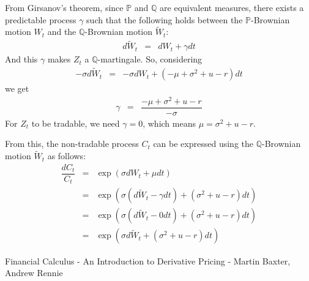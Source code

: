 \documentclass[uplatex,a4j,12pt,dvipdfmx]{jsarticle}
\begin{document}
From Girsanov's theorem, since $\mathbb{P}$ and $\mathbb{Q}$ are equivalent measures, there exists a predictable process $\gamma$ such that the following holds between the $\mathbb{P}$-Brownian motion $W_{t}$ and the $\mathbb{Q}$-Brownian motion $\tilde{W}_{t}$:
%
%
\begin{eqnarray*}
	d \tilde{W}_{t}
	&=&
	d W_{t} + \gamma dt
\end{eqnarray*}
%
%
And this $\gamma$ makes $Z_{t}$ a $\mathbb{Q}$-martingale. So, considering
%
%
\begin{eqnarray*}
	- \sigma d \tilde{W}_{t}
	&=&
	- \sigma d W_{t} + \left( - \mu + \sigma^{2} + u - r \right) d t
\end{eqnarray*}
%
%
we get
%
%
\begin{eqnarray*}
	\gamma
	&=&
	\dfrac{- \mu + \sigma^{2} + u - r}{ - \sigma}
\end{eqnarray*}
%
%
For $Z_{t}$ to be tradable, we need $\gamma = 0$, which means $\mu = \sigma^{2} + u - r$.

From this, the non-tradable process $C_{t}$ can be expressed using the $\mathbb{Q}$-Brownian motion $\tilde{W}_{t}$ as follows:
%
%
\begin{eqnarray*}
	\dfrac{dC_{t}}{C_{t}}
	&=&
	\exp \left( \sigma dW_{t} + \mu dt \right)
	\\ &=&
	\exp \left( \sigma ( d \tilde{W}_{t} - \gamma d t) + (\sigma^{2} + u - r) dt \right)
	\\ &=&
	\exp \left( \sigma (d \tilde{W}_{t} - 0 d t) + (\sigma^{2} + u - r) dt \right)
	\\ &=&
	\exp \left( \sigma d \tilde{W}_{t} + (\sigma^{2} + u - r) dt \right)
\end{eqnarray*}
%
%

\begin{thebibliography}{9}
	Financial Calculus - An Introduction to Derivative Pricing - Martin Baxter, Andrew Rennie
\end{thebibliography}
\end{document}
